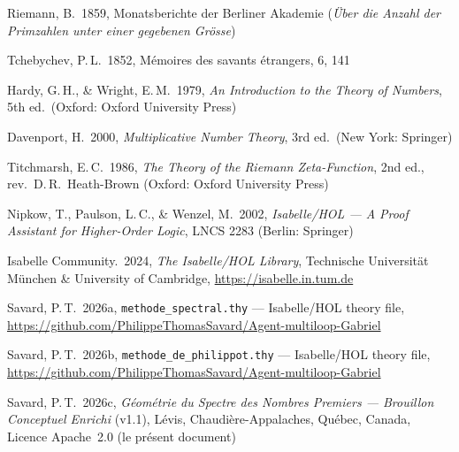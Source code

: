 \documentclass[]{pasj02}
\begin{document}
\begin{thebibliography}{}

  Riemann, B.\ 1859, Monatsberichte der Berliner Akademie
  (\emph{Über die Anzahl der Primzahlen unter einer gegebenen Grösse})

  Tchebychev, P.\,L.\ 1852, Mémoires des savants étrangers, 6, 141

  Hardy, G.\,H., \& Wright, E.\,M.\ 1979, \emph{An Introduction to the
  Theory of Numbers}, 5th ed.\ (Oxford: Oxford University Press)

  Davenport, H.\ 2000, \emph{Multiplicative Number Theory}, 3rd ed.\
  (New York: Springer)

  Titchmarsh, E.\,C.\ 1986, \emph{The Theory of the Riemann Zeta-Function},
  2nd ed., rev.\ D.\,R.\ Heath-Brown (Oxford: Oxford University Press)

  Nipkow, T., Paulson, L.\,C., \& Wenzel, M.\ 2002,
  \emph{Isabelle/HOL --- A Proof Assistant for Higher-Order Logic},
  LNCS 2283 (Berlin: Springer)

  Isabelle Community.\ 2024, \emph{The Isabelle/HOL Library},
  Technische Universität München \& University of Cambridge,
  \url{https://isabelle.in.tum.de}

  Savard, P.\,T.\ 2026a, \texttt{methode\_spectral.thy} --- Isabelle/HOL
  theory file,
  \url{https://github.com/PhilippeThomasSavard/Agent-multiloop-Gabriel}

  Savard, P.\,T.\ 2026b, \texttt{methode\_de\_philippot.thy} ---
  Isabelle/HOL theory file,
  \url{https://github.com/PhilippeThomasSavard/Agent-multiloop-Gabriel}

  Savard, P.\,T.\ 2026c, \emph{Géométrie du Spectre des Nombres Premiers
  --- Brouillon Conceptuel Enrichi} (v1.1),
  Lévis, Chaudière-Appalaches, Québec, Canada, Licence Apache~2.0
  (le présent document)

\end{thebibliography}
\end{document}
